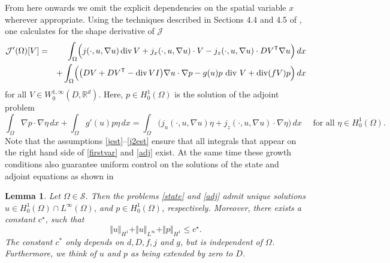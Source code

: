 \documentclass[10pt,a4paper]{amsart}
\newtheorem{lemma}{Lemma}
\DeclareMathOperator{\Div}{div}
\newcommand{\dx}{\,dx}
\begin{document}
\noindent
From here onwards we omit the explicit dependencies on the spatial variable $x$ wherever appropriate. 
Using the techniques described in Sections 4.4 and 4.5 of \cite{ADJ21}, one calculates for the shape  derivative of $\mathcal J$
\begin{eqnarray}
 \mathcal J'(\Omega)[V] 
 & = &  \int_{\Omega} \Bigl( j(\cdot,u,\nabla u) \Div V + j_x(\cdot,u,\nabla u)\cdot  V  - j_z(\cdot,u,\nabla u) \cdot DV^{\mathsf{T}} \nabla u \Bigr)  \dx    \label{firstvar} \\
 & & + \int_{\Omega} \Bigl(  \bigl( DV + D V^{\mathsf{T}} - \Div V I \bigr)  \nabla u \cdot \nabla p - g(u)p \mbox{ div }V + {\Div}( f V) p   \Bigr)  \dx \nonumber
\end{eqnarray}
for all $V \in W^{1,\infty}_0(D, \mathbb R^d)$. Here,
$p \in H^1_0(\Omega)$ is the solution of the adjoint problem
\begin{equation} \label{adj}
\int_{\Omega} \nabla p \cdot \nabla \eta  \dx + \int_{\Omega} g'(u) p \eta \dx = \int_{\Omega} \bigl( j_u(\cdot,u,\nabla u) \eta + j_z(\cdot,u,\nabla u) \cdot \nabla \eta \bigr)  \dx \quad \mbox{ for all } \eta \in H^1_0(\Omega).
\end{equation}
Note that the assumptions \eqref{jest}--\eqref{j2est} ensure that
all integrals that appear on the right hand side of \eqref{firstvar} and \eqref{adj} exist. At the same time these growth conditions
also guarantee uniform control on the solutions of the state
and adjoint equations as shown in 
\begin{lemma} \label{lem:apriori} Let $\Omega \in \mathcal S$. Then the problems \eqref{state} and \eqref{adj} admit unique solutions $u\in H^1_0(\Omega)\cap L^\infty(\Omega)$, and $p \in H^1_0(\Omega)$, respectively. Moreover, there exists a constant $c^\star$, such that
\begin{equation} \label{discapriori}
\Vert u \Vert_{H^1} + \Vert u\Vert_{L^\infty} + \Vert p \Vert_{H^1} \leq c^\star.
\end{equation}
The constant $c^*$ only depends on $d,D, f,j$ and $g$, but
is independent of $\Omega$. Furthermore, we think of $u$ and $p$ as being extended by zero to $D$.
\end{lemma}
\end{document}
